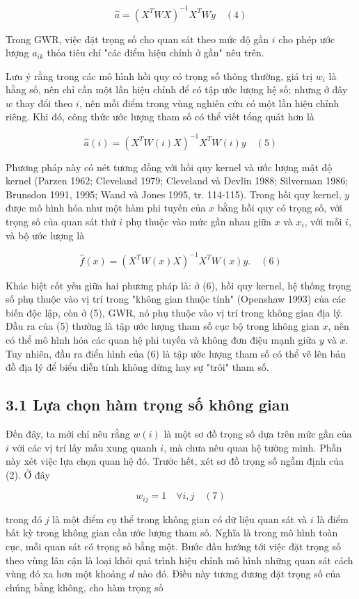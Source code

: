 \[\hat{a} = (X^T W X)^{-1} X^T W y \quad (4)\]

Trong GWR, việc đặt trọng số cho quan sát theo mức độ gần \(i\) cho phép ước lượng \(a_{ik}\) thỏa tiêu chí "các điểm hiệu chỉnh ở gần" nêu trên.

Lưu ý rằng trong các mô hình hồi quy có trọng số thông thường, giá trị \(w_i\) là hằng số, nên chỉ cần một lần hiệu chỉnh để có tập ước lượng hệ số; nhưng ở đây \(w\) thay đổi theo \(i\), nên mỗi điểm trong vùng nghiên cứu có một lần hiệu chỉnh riêng. Khi đó, công thức ước lượng tham số có thể viết tổng quát hơn là

\[\hat{a}(i) = (X^T W(i) X)^{-1} X^T W(i) y \quad (5)\]

Phương pháp này có nét tương đồng với hồi quy kernel và ước lượng mật độ kernel (Parzen 1962; Cleveland 1979; Cleveland và Devlin 1988; Silverman 1986; Brunsdon 1991, 1995; Wand và Jones 1995, tr. 114-115). Trong hồi quy kernel, \(y\) được mô hình hóa như một hàm phi tuyến của \(x\) bằng hồi quy có trọng số, với trọng số của quan sát thứ \(i\) phụ thuộc vào mức gần nhau giữa \(x\) và \(x_i\), với mỗi \(i\), và bộ ước lượng là

\[\hat{f}(x) = (X^T W(x) X)^{-1} X^T W(x) y. \quad (6)\]

Khác biệt cốt yếu giữa hai phương pháp là: ở (6), hồi quy kernel, hệ thống trọng số phụ thuộc vào vị trí trong "không gian thuộc tính" (Openshaw 1993) của các biến độc lập, còn ở (5), GWR, nó phụ thuộc vào vị trí trong không gian địa lý. Đầu ra của (5) thường là tập ước lượng tham số cục bộ trong không gian \(x\), nên có thể mô hình hóa các quan hệ phi tuyến và không đơn điệu mạnh giữa \(y\) và \(x\). Tuy nhiên, đầu ra điển hình của (6) là tập ước lượng tham số có thể vẽ lên bản đồ địa lý để biểu diễn tính không dừng hay sự "trôi" tham số.

\subsection{3.1 Lựa chọn hàm trọng số không gian}

Đến đây, ta mới chỉ nêu rằng \(w(i)\) là một sơ đồ trọng số dựa trên mức gần của \(i\) với các vị trí lấy mẫu xung quanh \(i\), mà chưa nêu quan hệ tường minh. Phần này xét việc lựa chọn quan hệ đó. Trước hết, xét sơ đồ trọng số ngầm định của (2). Ở đây

\[w_{ij} = 1 \quad \forall i, j \quad (7)\]

trong đó \(j\) là một điểm cụ thể trong không gian có dữ liệu quan sát và \(i\) là điểm bất kỳ trong không gian cần ước lượng tham số. Nghĩa là trong mô hình toàn cục, mỗi quan sát có trọng số bằng một. Bước đầu hướng tới việc đặt trọng số theo vùng lân cận là loại khỏi quá trình hiệu chỉnh mô hình những quan sát cách vùng đó xa hơn một khoảng \(d\) nào đó. Điều này tương đương đặt trọng số của chúng bằng không, cho hàm trọng số

